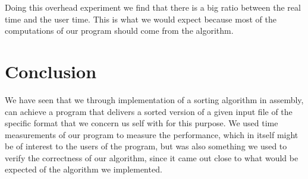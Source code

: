 \documentclass{article}
\begin{document}
Doing this overhead experiment we find that there is a big ratio between the real time and the user time. This is what we would expect because most of the computations of our program should come from the algorithm.

\section{Conclusion}
We have seen that we through implementation of a sorting algorithm in assembly, can achieve a program that delivers a sorted version of a given input file of the specific format that we  concern us self with for this purpose. We used time measurements of our program to measure the performance, which in itself might be of interest to the users of the program, but was also something we used to verify the correctness of our algorithm, since it came out close to what would be expected of the algorithm we implemented.
\end{document}
